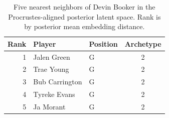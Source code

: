 \begin{table}[htbp]
  \centering\small
  \begin{tabular}{rllc}
    \toprule
    Rank & Player & Position & Archetype \\
    \midrule
    1 & Jalen Green & G & 2 \\
    2 & Trae Young & G & 2 \\
    3 & Bub Carrington & G & 2 \\
    4 & Tyreke Evans & G & 2 \\
    5 & Ja Morant & G & 2 \\
    \bottomrule
  \end{tabular}
  \caption{Five nearest neighbors of Devin Booker in the Procrustes-aligned posterior latent space. Rank is by posterior mean embedding distance.}
  \label{tab:Devin_Booker_neighbors}
\end{table}

